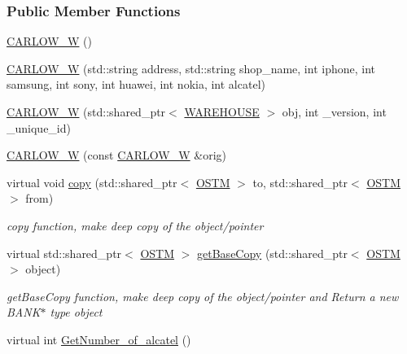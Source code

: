 \subsubsection*{Public Member Functions}
\begin{DoxyCompactItemize}
\item 
\hyperlink{class_c_a_r_l_o_w___w_a8ae6ca6f4db7ea5240322fd27824c55a_a8ae6ca6f4db7ea5240322fd27824c55a}{C\+A\+R\+L\+O\+W\+\_\+W} ()
\item 
\hyperlink{class_c_a_r_l_o_w___w_aa13cfb47255f935a3b27708b68e52129_aa13cfb47255f935a3b27708b68e52129}{C\+A\+R\+L\+O\+W\+\_\+W} (std\+::string address, std\+::string shop\+\_\+name, int iphone, int samsung, int sony, int huawei, int nokia, int alcatel)
\item 
\hyperlink{class_c_a_r_l_o_w___w_ad3b772ca2d09eba4a273cb0c7cece747_ad3b772ca2d09eba4a273cb0c7cece747}{C\+A\+R\+L\+O\+W\+\_\+W} (std\+::shared\+\_\+ptr$<$ \hyperlink{class_w_a_r_e_h_o_u_s_e}{W\+A\+R\+E\+H\+O\+U\+SE} $>$ obj, int \+\_\+version, int \+\_\+unique\+\_\+id)
\item 
\hyperlink{class_c_a_r_l_o_w___w_a267a2792c59f475740a68953c8437205_a267a2792c59f475740a68953c8437205}{C\+A\+R\+L\+O\+W\+\_\+W} (const \hyperlink{class_c_a_r_l_o_w___w}{C\+A\+R\+L\+O\+W\+\_\+W} \&orig)
\item 
virtual void \hyperlink{class_c_a_r_l_o_w___w_ac91cb7cbae77752e334e273b97fb988b_ac91cb7cbae77752e334e273b97fb988b}{copy} (std\+::shared\+\_\+ptr$<$ \hyperlink{class_o_s_t_m}{O\+S\+TM} $>$ to, std\+::shared\+\_\+ptr$<$ \hyperlink{class_o_s_t_m}{O\+S\+TM} $>$ from)
\begin{DoxyCompactList}\small\item\em copy function, make deep copy of the object/pointer \end{DoxyCompactList}\item 
virtual std\+::shared\+\_\+ptr$<$ \hyperlink{class_o_s_t_m}{O\+S\+TM} $>$ \hyperlink{class_c_a_r_l_o_w___w_a1a76566c3a7c01cf469007741dac6b97_a1a76566c3a7c01cf469007741dac6b97}{get\+Base\+Copy} (std\+::shared\+\_\+ptr$<$ \hyperlink{class_o_s_t_m}{O\+S\+TM} $>$ object)
\begin{DoxyCompactList}\small\item\em get\+Base\+Copy function, make deep copy of the object/pointer and Return a new B\+A\+N\+K$\ast$ type object \end{DoxyCompactList}\item 
virtual int \hyperlink{class_c_a_r_l_o_w___w_ae7ab8852e5eeff1c2cd397126fbac0e7_ae7ab8852e5eeff1c2cd397126fbac0e7}{Get\+Number\+\_\+of\+\_\+alcatel} ()

\end{DoxyCompactItemize}
